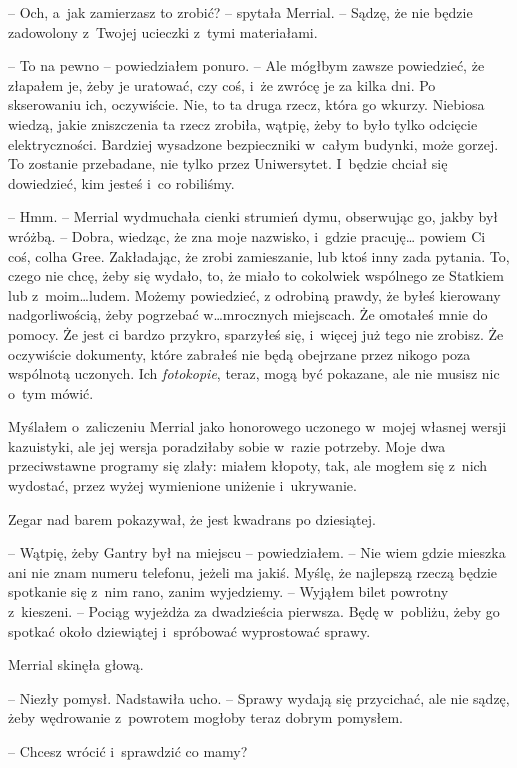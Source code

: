 \documentclass[oneside,polish,11pt,sfheadings]{mwbk}
\begin{document}
-- Och, a~jak zamierzasz to zrobić? -- spytała Merrial. -- Sądzę, że nie
będzie zadowolony z~Twojej ucieczki z~tymi materiałami.

-- To na pewno -- powiedziałem ponuro. -- Ale mógłbym zawsze powiedzieć, że
złapałem je, żeby je uratować, czy coś, i~że zwrócę je za kilka dni. Po
skserowaniu ich, oczywiście. Nie, to ta druga rzecz, która go wkurzy.
Niebiosa wiedzą, jakie zniszczenia ta rzecz zrobiła, wątpię, żeby to
było tylko odcięcie elektryczności. Bardziej wysadzone bezpieczniki w~całym budynki, może gorzej. To zostanie przebadane, nie tylko przez
Uniwersytet. I~będzie chciał się dowiedzieć, kim jesteś i~co robiliśmy.

-- Hmm. -- Merrial wydmuchała cienki strumień dymu, obserwując go, jakby
był wróżbą. -- Dobra, wiedząc, że zna moje nazwisko, i~gdzie pracuję\ldots
powiem Ci coś, colha Gree. Zakładając, że zrobi zamieszanie, lub ktoś
inny zada pytania. To, czego nie chcę, żeby się wydało, to, że miało to
cokolwiek wspólnego ze Statkiem lub z~moim\ldots ludem. Możemy powiedzieć,
z odrobiną prawdy, że byłeś kierowany nadgorliwością, żeby pogrzebać
w\ldots mrocznych miejscach. Że omotałeś mnie do pomocy. Że jest ci bardzo
przykro, sparzyłeś się, i~więcej już tego nie zrobisz. Że oczywiście
dokumenty, które zabrałeś nie będą obejrzane przez nikogo poza wspólnotą
uczonych. Ich \textit{fotokopie}, teraz, mogą być pokazane, ale nie musisz
nic o~tym mówić.

Myślałem o~zaliczeniu Merrial jako honorowego uczonego w~mojej własnej
wersji kazuistyki, ale jej wersja poradziłaby sobie w~razie potrzeby.
Moje dwa przeciwstawne programy się zlały: miałem kłopoty, tak, ale
mogłem się z~nich wydostać, przez wyżej wymienione uniżenie i~ukrywanie.

Zegar nad barem pokazywał, że jest kwadrans po dziesiątej.

-- Wątpię, żeby Gantry był na miejscu -- powiedziałem. -- Nie wiem gdzie
mieszka ani nie znam numeru telefonu, jeżeli ma jakiś. Myślę, że
najlepszą rzeczą będzie spotkanie się z~nim rano, zanim wyjedziemy. -- Wyjąłem bilet powrotny z~kieszeni. -- Pociąg wyjeżdża za dwadzieścia
pierwsza. Będę w~pobliżu, żeby go spotkać około dziewiątej i~spróbować
wyprostować sprawy.

Merrial skinęła głową. 

-- Niezły pomysł. Nadstawiła ucho. -- Sprawy wydają
się przycichać, ale nie sądzę, żeby wędrowanie z~powrotem mogłoby teraz
dobrym pomysłem.

-- Chcesz wrócić i~sprawdzić co mamy?
\end{document}

